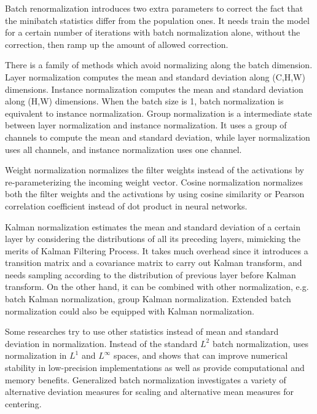 \documentclass[runningheads]{llncs}
\begin{document}
Batch renormalization \cite{ioffe2017batch} introduces two extra parameters to correct the fact that the minibatch statistics differ from the population ones.
It needs train the model for a certain number of iterations with batch normalization alone, without the correction, then ramp up the amount of allowed correction.

There is a family of methods which avoid normalizing along the batch dimension. Layer normalization \cite{ba2016layer} computes the mean and standard deviation along (C,H,W) dimensions. Instance normalization \cite{ulyanov2016instance} computes the mean and standard deviation along (H,W) dimensions. When the batch size is 1, batch normalization is equivalent to instance normalization.
Group normalization \cite{wu2018group} is a intermediate state between layer normalization and instance normalization. It uses a group of channels to compute the mean and standard deviation,
while layer normalization uses all channels, and instance normalization uses one channel.

Weight normalization \cite{salimans2016weight} normalizes the filter weights instead of the activations by re-parameterizing the incoming weight vector.  
Cosine normalization \cite{luo2017cosine} normalizes both the filter weights and the activations by using cosine similarity or Pearson correlation coefficient instead of dot product in neural networks.

Kalman normalization \cite{wang2018kalman} estimates the mean and standard deviation of a certain layer by considering the distributions of all its preceding layers, mimicking the merits of Kalman Filtering Process. It takes much overhead since it introduces a transition matrix and a covariance matrix to carry out Kalman transform, and needs sampling according to the distribution of previous layer before Kalman transform. 
On the other hand, it can be combined with other normalization, e.g. batch Kalman normalization, group Kalman normalization. Extended batch normalization could also be equipped with Kalman normalization.

Some researches try to use other statistics instead of mean and standard deviation in normalization. Instead of the standard $L^{2}$ batch normalization, \cite{hoffer2018norm} uses normalization in $L^{1}$ and $L^{\infty}$ spaces, and shows that can improve numerical stability in low-precision implementations as well as provide computational and memory benefits. Generalized batch normalization \cite{yuan2019generalized} investigates a variety of alternative deviation measures for scaling and alternative mean measures for centering.
\end{document}
